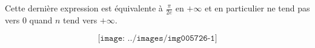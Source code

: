 {{\begin{enumerate}
Cette dernière expression est équivalente à $\frac{\pi}{2e}$ en $+\infty$ et en particulier ne tend pas vers $0$ quand $n$ tend vers $+\infty$. 

\begin{center}
\end{center}

$$\texttt{[image: ../images/img005726-1]}$$


\begin{center}
\end{center}
\end{enumerate}}
}